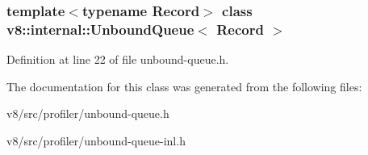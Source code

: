 \subsubsection*{template$<$typename Record$>$\newline
class v8\+::internal\+::\+Unbound\+Queue$<$ Record $>$}



Definition at line 22 of file unbound-\/queue.\+h.



The documentation for this class was generated from the following files\+:\begin{DoxyCompactItemize}
\item 
v8/src/profiler/unbound-\/queue.\+h\item 
v8/src/profiler/unbound-\/queue-\/inl.\+h\end{DoxyCompactItemize}

